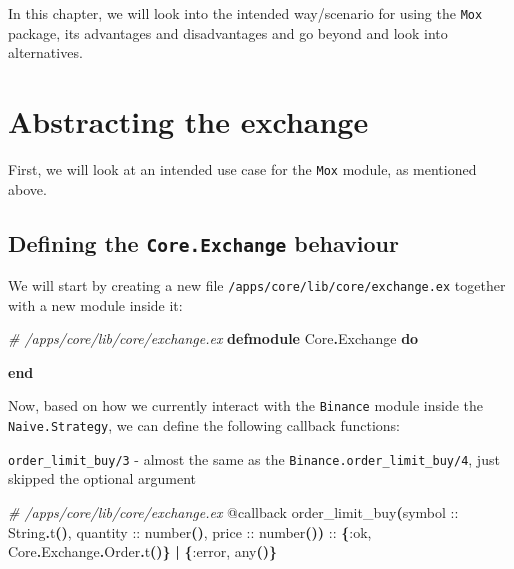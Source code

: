 \documentclass[
  oneside]{book}
\newenvironment{Shaded}{\begin{snugshade}}{\end{snugshade}}
\newcommand{\CommentTok}[1]{\textcolor[rgb]{0.56,0.35,0.01}{\textit{#1}}}
\newcommand{\ConstantTok}[1]{\textcolor[rgb]{0.56,0.35,0.01}{#1}}
\newcommand{\FunctionTok}[1]{\textcolor[rgb]{0.13,0.29,0.53}{\textbf{#1}}}
\newcommand{\KeywordTok}[1]{\textcolor[rgb]{0.13,0.29,0.53}{\textbf{#1}}}
\newcommand{\NormalTok}[1]{#1}
\newcommand{\OperatorTok}[1]{\textcolor[rgb]{0.81,0.36,0.00}{\textbf{#1}}}
\newcommand{\OtherTok}[1]{\textcolor[rgb]{0.56,0.35,0.01}{#1}}
\newcommand{\VariableTok}[1]{\textcolor[rgb]{0.00,0.00,0.00}{#1}}
\begin{document}
In this chapter, we will look into the intended way/scenario for using the \texttt{Mox} package, its advantages and disadvantages and go beyond and look into alternatives.

\section{Abstracting the exchange}\label{abstracting-the-exchange}

First, we will look at an intended use case for the \texttt{Mox} module, as mentioned above.

\subsection{\texorpdfstring{Defining the \texttt{Core.Exchange} behaviour}{Defining the Core.Exchange behaviour}}\label{defining-the-core.exchange-behaviour}

We will start by creating a new file \texttt{/apps/core/lib/core/exchange.ex} together with a new module inside it:

\begin{Shaded}
\begin{Highlighting}[]
\CommentTok{\# /apps/core/lib/core/exchange.ex}
\KeywordTok{defmodule} \ConstantTok{Core}\OperatorTok{.}\ConstantTok{Exchange} \KeywordTok{do}

\KeywordTok{end}
\end{Highlighting}
\end{Shaded}

\newpage

Now, based on how we currently interact with the \texttt{Binance} module inside the \texttt{Naive.Strategy}, we can define the following callback functions:

\texttt{order\_limit\_buy/3} - almost the same as the \texttt{Binance.order\_limit\_buy/4}, just skipped the optional argument

\begin{Shaded}
\begin{Highlighting}[]
  \CommentTok{\# /apps/core/lib/core/exchange.ex}
  \OtherTok{@callback}\NormalTok{ order\_limit\_buy}\FunctionTok{(}\NormalTok{symbol :: }\ConstantTok{String}\OperatorTok{.}\NormalTok{t}\FunctionTok{()}\NormalTok{, quantity :: number}\FunctionTok{()}\NormalTok{, price :: number}\FunctionTok{())}\NormalTok{ ::}
              \FunctionTok{\{}\VariableTok{:ok}\NormalTok{, }\ConstantTok{Core}\OperatorTok{.}\ConstantTok{Exchange}\OperatorTok{.}\ConstantTok{Order}\OperatorTok{.}\NormalTok{t}\FunctionTok{()\}}
              \OperatorTok{|} \FunctionTok{\{}\VariableTok{:error}\NormalTok{, any}\FunctionTok{()\}}
\end{Highlighting}
\end{Shaded}
\end{document}
